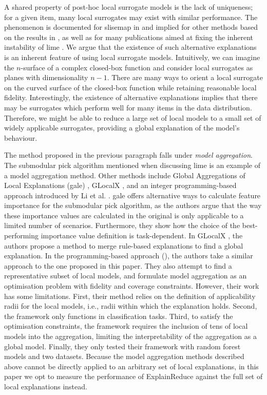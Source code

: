 A shared property of post-hoc local surrogate models is the lack of uniqueness; for a given item, many local surrogates may exist with similar performance.
The phenomenon is documented for {\sc slisemap} in \cite{bjorklund2023slisemap} and implied for other methods based on the results in \cite{dombrowski2019explanations}, as well as for many publications aimed at fixing the inherent instability of {\sc lime} \cite{shankar2019alime, zafar2019dlime, zhao2021baylime}.
We argue that the existence of such alternative explanations is an inherent feature of using local surrogate models.
Intuitively, we can imagine the $n$-surface of a complex closed-box function and consider local surrogates as planes with dimensionality $n-1$.
There are many ways to orient a local surrogate on the curved surface of the closed-box function while retaining reasonable local fidelity.
Interestingly, the existence of alternative explanations implies that there may be surrogates which perform well for many items in the data distribution.
Therefore, we might be able to reduce a large set of local models to a small set of widely applicable surrogates, providing a global explanation of the model's behaviour.

The method proposed in the previous paragraph falls under \emph{model aggregation}.
The submodular pick algorithm mentioned when discussing {\sc lime} is an example of a model aggregation method.
Other methods include Global Aggregations of Local Explanations ({\sc gale}) \cite{vanderlinden2019global}, {\sc GLocalX} \cite{setzu2021glocalx}, and an integer programming-based approach introduced by Li et al. \cite{li2022optimal}.
{\sc gale} offers alternative ways to calculate feature importance for the submodular pick algorithm, as the authors argue that the way these importance values are calculated in the original \cite{ribeiro2016} is only applicable to a limited number of scenarios.
Furthermore, they show how the choice of the best-performing importance value definition is task-dependent.
In {\sc GLocalX} \cite{setzu2021glocalx}, the authors propose a method to merge rule-based explanations to find a global explanation.
In the programming-based approach (\cite{li2022optimal}), the authors take a similar approach to the one proposed in this paper.
They also attempt to find a representative subset of local models, and formulate model aggregation as an optimisation problem with fidelity and coverage constraints.
However, their work has some limitations.
First, their method relies on the definition of applicability radii for the local models, i.e., radii within which the explanation holds.
Second, the framework only functions in classification tasks.
Third, to satisfy the optimisation constraints, the framework requires the inclusion of tens of local models into the aggregation, limiting the interpretability of the aggregation as a global model.
Finally, they only tested their framework with random forest models and two datasets.
Because the model aggregation methods described above cannot be directly applied to an arbitrary set of local explanations, in this paper we opt to measure the performance of {\sc ExplainReduce} against the full set of local explanations instead.